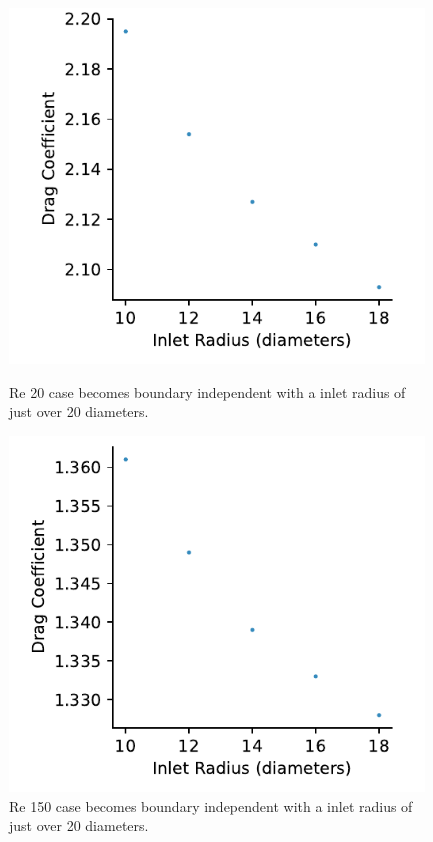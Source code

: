 \documentclass[10pt,english]{article}
\begin{document}
\begin{figure}[h!]
\centering
\begin{minipage}{.47\textwidth}
  \centering
\includegraphics[trim={0.0cm 0cm 0.0cm 0cm},clip,width=0.98\textwidth]{boundary20}
\vspace{3pt}
\caption{Re 20 case becomes boundary independent with a inlet radius of just over 20 diameters.}
\label{f:boundary20}
\end{minipage}%
\hspace{10pt}
\begin{minipage}{.47\textwidth}
  \centering
\includegraphics[trim={0.0cm 0cm 0.0cm 0cm},clip,width=0.98\textwidth]{boundary150}
\caption{Re 150 case becomes boundary independent with a inlet radius of just over 20 diameters.}
\label{f:boundary150}
\end{minipage}
\end{figure}
\end{document}
